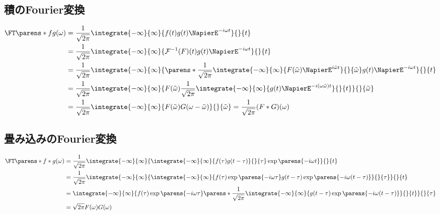         \subsection{積のFourier変換}
            \begin{align*}
                \FT\parens*{fg}(\omega) &= \frac{1}{\sqrt{2\pi}}\integrate{-\infty}{\infty}{f(t)g(t)\NapierE^{-i\omega t}}{}{t} \\
                &= \frac{1}{\sqrt{2\pi}}\integrate{-\infty}{\infty}{\mathcal{F}^{-1}(F)(t)g(t)\NapierE^{-i\omega t}}{}{t} \\
                &= \frac{1}{\sqrt{2\pi}}\integrate{-\infty}{\infty}{\parens*{\frac{1}{\sqrt{2\pi}}\integrate{-\infty}{\infty}{F(\tilde{\omega})\NapierE^{i\tilde{\omega}t}}{}{\tilde{\omega}}}g(t)\NapierE^{-i\omega t}}{}{t} \\
                &= \frac{1}{\sqrt{2\pi}}\integrate{-\infty}{\infty}{F(\tilde{\omega})\frac{1}{\sqrt{2\pi}}\integrate{-\infty}{\infty}{g(t)\NapierE^{-i(\omega\tilde{\omega})t}}{}{t}}{}{\tilde{\omega}} \\
                &= \frac{1}{\sqrt{2\pi}}\integrate{-\infty}{\infty}{F(\tilde{\omega})G(\omega-\tilde{\omega})}{}{\tilde{\omega}} = \frac{1}{\sqrt{2\pi}}(F*G)(\omega)
            \end{align*}
        \subsection{畳み込みのFourier変換}
            \begin{align*}
                \FT\parens*{f*g}(\omega) &= \frac{1}{\sqrt{2\pi}}\integrate{-\infty}{\infty}{\integrate{-\infty}{\infty}{f(\tau)g(t-\tau)}{}{\tau}\exp\parens{-i\omega t}}{}{t} \\
                &= \frac{1}{\sqrt{2\pi}}\integrate{-\infty}{\infty}{\integrate{-\infty}{\infty}{f(\tau)\exp\parens{-i\omega\tau}g(t-\tau)\exp\parens{-i\omega (t-\tau)}}{}{\tau}}{}{t} \\
                &= \integrate{-\infty}{\infty}{f(\tau)\exp\parens{-i\omega\tau}\parens*{\frac{1}{\sqrt{2\pi}}\integrate{-\infty}{\infty}{g(t-\tau)\exp\parens{-i\omega (t-\tau)}}{}{t}}}{}{\tau} \\
                &= \sqrt{2\pi}F(\omega)G(\omega)
            \end{align*}
